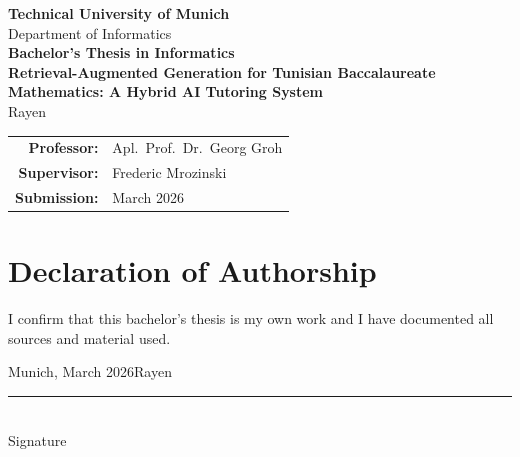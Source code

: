 \documentclass[12pt, a4paper, twoside]{article}
\newcommand{\thesistitle}{Retrieval-Augmented Generation for Tunisian Baccalaureate Mathematics: A Hybrid AI Tutoring System}
\newcommand{\authorname}{Rayen}  %
\newcommand{\professorname}{Apl.\ Prof.\ Dr.\ Georg Groh}
\newcommand{\supervisorname}{Frederic Mrozinski}
\newcommand{\submissiondate}{March 2026}
\begin{document}
\begin{titlepage}
\centering
\vspace*{1cm}


\vspace{1.5cm}

{\Large \textbf{Technical University of Munich}}\\[0.3cm]
{\large Department of Informatics}\\[2cm]

{\LARGE \textbf{Bachelor's Thesis in Informatics}}\\[1.5cm]

{\huge \textbf{\thesistitle}}\\[2cm]

{\Large \authorname}\\[3cm]

\begin{tabular}{rl}
\textbf{Professor:}   & \professorname \\
\textbf{Supervisor:}  & \supervisorname \\
\textbf{Submission:}  & \submissiondate \\
\end{tabular}

\vfill
\end{titlepage}

\newpage
\thispagestyle{empty}
\section*{Declaration of Authorship}

I confirm that this bachelor's thesis is my own work and I have documented all
sources and material used.

\vspace{2cm}
\noindent
Munich, \submissiondate \hfill \authorname

\vspace{1.5cm}
\noindent
\rule{6cm}{0.4pt}\\
\noindent Signature

\newpage

\thispagestyle{empty}

\end{document}
